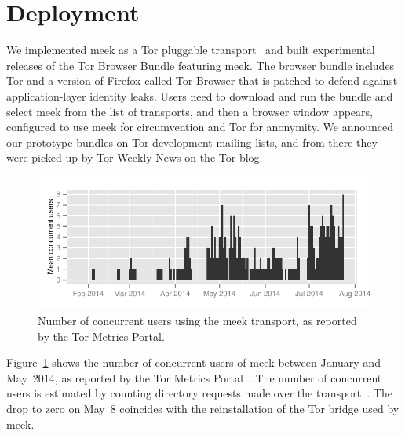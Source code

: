 \documentclass[conference]{IEEEtran}
\begin{document}



\section{Deployment}
\label{sec:deployment}

We implemented meek as a Tor pluggable transport~\cite{pt}
and built experimental releases of the Tor Browser Bundle featuring meek.
The browser bundle includes Tor and a version of Firefox
called Tor Browser that is patched to defend against application-layer identity leaks.
Users need to download and run the bundle and select meek from the list of transports,
and then a browser window appears,
configured to use meek for circumvention and Tor for anonymity.
We announced our prototype bundles on Tor development mailing lists,
and from there they were picked up by Tor Weekly News on the Tor blog.

\begin{figure}
\includegraphics[width=\linewidth]{clients-meek}
\caption{Number of concurrent users using the meek transport,
as reported by the Tor Metrics Portal.}
\label{fig:clients}
\end{figure}

Figure~\ref{fig:clients} shows the number of concurrent users of meek between January and May~2014,
as reported by the Tor Metrics Portal~\cite{metrics-meek}.
The number of concurrent users is estimated by counting directory requests made over the transport~\cite{counting-daily-bridge-users}.
The drop to zero on May~8 coincides with the reinstallation of the Tor bridge used by meek.
\end{document}
